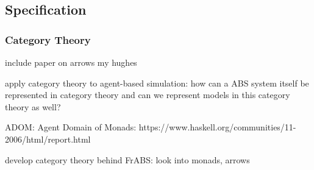 \subsection{Specification}
\subsubsection{Category Theory}
include paper on arrows my hughes

apply category theory to agent-based simulation: how can a ABS system itself be represented in category theory and can we represent models in this category theory as well?

ADOM: Agent Domain of Monads: https://www.haskell.org/communities/11-2006/html/report.html

 develop category theory behind FrABS: look into monads, arrows